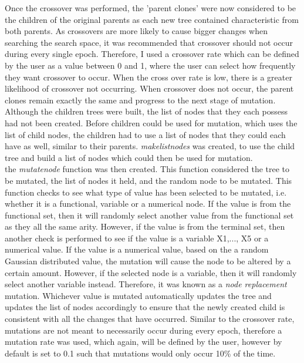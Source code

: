 \documentclass[11pt]{article}
\begin{document}
Once the crossover was performed, the 'parent clones' were now considered to be the children of the original parents as each new tree contained characteristic from both parents. As crossovers are more likely to cause bigger changes when searching the search space, it was recommended that crossover should not occur during every single epoch. Therefore, I used a crossover rate which can be defined by the user as a value between 0 and 1, where the user can select how frequently they want crossover to occur. When the cross over rate is low, there is a greater likelihood of crossover not occurring. When crossover does not occur, the parent clones remain exactly the same and progress to the next stage of mutation. \\

Although the children trees were built, the list of nodes that they each possess had not been created. Before children could be used for mutation, which uses the list of child nodes, the children had to use a list of nodes that they could each have as well, similar to their parents. \textit{make\textunderscore list\textunderscore nodes} was created, to use the child tree and build a list of nodes which could then be used for mutation. \\

the \textit{mutate\textunderscore node} function was then created. This function considered the tree to be mutated, the list of nodes it held, and the random node to be mutated. This function checks to see what type of value has been selected to be mutated, i.e. whether it is a functional, variable or a numerical node. If the value is from the functional set, then it will randomly select another value from the functional set as they all the same arity. However, if the value is from the terminal set, then another check is performed to see if the value is a variable X1,..., X5 or a numerical value. If the value is a numerical value, based on the a random Gaussian distributed value, the mutation will cause the node to be altered by a certain amount. However, if the selected node is a variable, then it will randomly select another variable instead. Therefore, it was known as a \textit{node replacement} mutation. Whichever value is mutated automatically updates the tree and updates the list of nodes accordingly to ensure that the newly created child is consistent with all the changes that have occurred. Similar to the crossover rate, mutations are not meant to necessarily occur during every epoch, therefore a mutation rate was used, which again, will be defined by the user, however by default is set to 0.1 such that mutations would only occur 10\% of the time.
\end{document}
